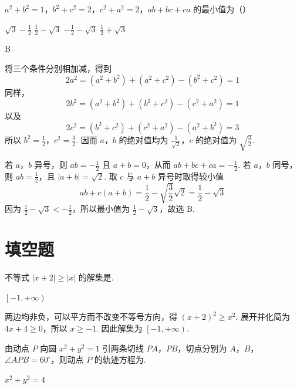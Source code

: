 \begin{problem}
\(a^2 + b^2 = 1\)，\(b^2 + c^2 = 2\)，\(c^2 + a^2 = 2\)，\(ab + bc + ca\) 的最小值为（\quad）

\choices
    {\(\sqrt{3} - \frac{1}{2}\)}
    {\(\frac{1}{2} -\sqrt{3}\)}
    {\(-\frac{1}{2} -\sqrt{3}\)}
    {\(\frac{1}{2} +\sqrt{3}\)}
\end{problem}

\begin{answer}
B
\end{answer}

\begin{solution}
将三个条件分别相加减，得到
\[
2a^2=(a^2+b^2)+(a^2+c^2)-(b^2+c^2)=1
\]
同样，
\[
2b^2=(a^2+b^2)+(b^2+c^2)-(c^2+a^2)=1
\]
以及
\[
2c^2=(b^2+c^2)+(c^2+a^2)-(a^2+b^2)=3
\]
所以 \(b^2=\frac12\)，\(c^2=\frac32\). 因而 \(a\)，\(b\) 的绝对值均为 \(\frac1{\sqrt2}\)，\(c\) 的绝对值为 \(\sqrt{\frac32}\).

若 \(a\)，\(b\) 异号，则 \(ab=-\frac12\) 且 \(a+b=0\)，从而 \(ab+bc+ca=-\frac12\). 若 \(a\)，\(b\) 同号，则 \(ab=\frac12\)，且 \(\lvert a+b\rvert=\sqrt2\). 取 \(c\) 与 \(a+b\) 异号时取得较小值
\[
ab+c(a+b)=\frac12-\sqrt{\frac32}\sqrt2=\frac12-\sqrt3
\]
因为 \(\frac12-\sqrt3<-\frac12\)，所以最小值为 \(\frac12-\sqrt3\)，故选 B.
\end{solution}

\section{填空题}
\begin{problem}
不等式 \( |x + 2| \geqslant |x| \) 的解集是\fillinblank{}.
\end{problem}

\begin{answer}
\(\left[-1,+\infty\right)\)
\end{answer}

\begin{solution}
两边均非负，可以平方而不改变不等号方向，得 \((x+2)^2\geqslant x^2\). 展开并化简为 \(4x+4\geqslant0\)，所以 \(x\geqslant-1\). 因此解集为 \(\left[-1,+\infty\right)\).
\end{solution}

\begin{problem}
由动点 \(P\) 向圆 \(x^{2} + y^{2} = 1\) 引两条切线 \(PA\)，\(PB\)，切点分别为 \(A\)，\(B\)，\(\angle APB = 60^{\circ}\)，则动点 \(P\) 的轨迹方程为\fillinblank{}.
\end{problem}

\begin{answer}
\(x^{2}+y^{2}=4\)
\end{answer}

